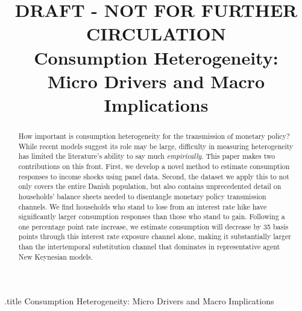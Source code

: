 \documentclass[titlepage]{\econtex}\newcommand{\texname}{ConsumptionHeterogeneity}
\begin{document}




\begin{verbatimwrite}{\jobname.title}
Consumption Heterogeneity: Micro Drivers and Macro Implications
\end{verbatimwrite}

\hfill{\tiny \jobname}

\title{DRAFT - NOT FOR FURTHER CIRCULATION\\ 
	\bigskip
	\bigskip
	Consumption Heterogeneity: \\ Micro Drivers and Macro Implications}



\maketitle

\begin{abstract}
	How important is consumption heterogeneity for the transmission of monetary policy? While recent models suggest its role may be large, difficulty in measuring heterogeneity has limited the literature's ability to say much \textit{empirically}. This paper makes two contributions on this front. First, we develop a novel method to estimate consumption responses to income shocks using panel data. Second, the dataset we apply this to not only covers the entire Danish population, but also contains unprecedented detail on households' balance sheets needed to disentangle monetary policy transmission channels. We find households who stand to lose from an interest rate hike have significantly larger consumption responses than those who stand to gain. Following a one percentage point rate increase, we estimate consumption will decrease by 35 basis points through this interest rate exposure channel alone, making it substantially larger than the intertemporal substitution channel that dominates in representative agent New Keynesian models.
%  
\end{abstract}
\end{document}
